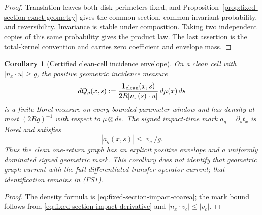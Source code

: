 \documentclass[11pt]{article}
\newtheorem{corollary}[theorem]{Corollary}
\begin{document}
\begin{proof}
Translation leaves both disk perimeters fixed, and
Proposition~\ref{prop:fixed-section-exact-geometry} gives the common section,
common invariant probability, and reversibility.  Invariance is stable under
composition.  Taking two independent copies of this same probability gives
the product law.  The last assertion is the total-kernel convention and
carries zero coefficient and envelope mass.
\end{proof}

\begin{corollary}[Certified clean-cell incidence envelope]
\label{cor:fixed-section-clean-incidence-envelope}
On a clean cell with $|n_x\cdot u|\ge g$, the positive geometric incidence
measure
\[
 dQ_g(x,s):=
 \frac{\mathbf 1_{\rm clean}(x,s)}{2R|n_x(s)\cdot u|}\,d\mu(x)\,ds
\]
is a finite Borel measure on every bounded parameter window and has density at
most $(2Rg)^{-1}$ with respect to $\mu\otimes ds$.  The signed impact-time
mark $a_g=\partial_st_x$ is Borel and satisfies
\[
 |a_g(x,s)|\le |v_c|/g.
\]
Thus the clean one-return graph has an explicit positive envelope and a
uniformly dominated signed geometric mark.  This corollary does not identify
that geometric graph current with the full differentiated transfer-operator
current; that identification remains in \textup{(FS1)}.
\end{corollary}

\begin{proof}
The density formula is \eqref{eq:fixed-section-impact-coarea}; the mark bound
follows from \eqref{eq:fixed-section-impact-derivative} and
$|n_x\cdot v_c|\le |v_c|$.
\end{proof}
\end{document}
